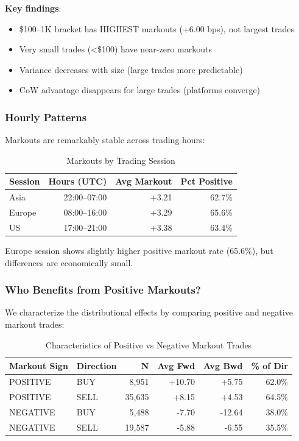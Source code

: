 \documentclass[12pt,a4paper]{article}
\begin{document}
\textbf{Key findings}:
\begin{itemize}
    \item \$100--1K bracket has HIGHEST markouts (+6.00 bps), not largest trades
    \item Very small trades (<\$100) have near-zero markouts
    \item Variance decreases with size (large trades more predictable)
    \item CoW advantage disappears for large trades (platforms converge)
\end{itemize}

\subsubsection{Hourly Patterns}

Markouts are remarkably stable across trading hours:

\begin{table}[H]
\centering
\caption{Markouts by Trading Session}
\label{tab:hourly}
\begin{tabular}{lrrr}
\toprule
\textbf{Session} & \textbf{Hours (UTC)} & \textbf{Avg Markout} & \textbf{Pct Positive} \\
\midrule
Asia & 22:00--07:00 & +3.21 & 62.7\% \\
Europe & 08:00--16:00 & +3.29 & 65.6\% \\
US & 17:00--21:00 & +3.38 & 63.4\% \\
\bottomrule
\end{tabular}
\end{table}

Europe session shows slightly higher positive markout rate (65.6\%), but differences are economically small.

\subsubsection{Who Benefits from Positive Markouts?}

We characterize the distributional effects by comparing positive and negative markout trades:

\begin{table}[H]
\centering
\caption{Characteristics of Positive vs Negative Markout Trades}
\label{tab:distribution}
\begin{tabular}{llrrrr}
\toprule
\textbf{Markout Sign} & \textbf{Direction} & \textbf{N} & \textbf{Avg Fwd} & \textbf{Avg Bwd} & \textbf{\% of Dir} \\
\midrule
POSITIVE & BUY & 8,951 & +10.70 & +5.75 & 62.0\% \\
POSITIVE & SELL & 35,635 & +8.15 & +4.53 & 64.5\% \\
NEGATIVE & BUY & 5,488 & -7.70 & -12.64 & 38.0\% \\
NEGATIVE & SELL & 19,587 & -5.88 & -6.55 & 35.5\% \\
\bottomrule
\end{tabular}
\end{table}
\end{document}
